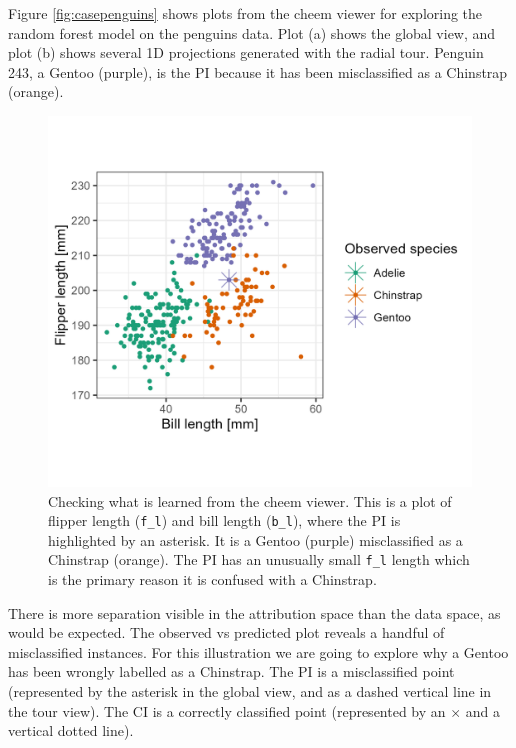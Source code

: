 \documentclass[
]{article}
\begin{document}
Figure \ref{fig:casepenguins} shows plots from the cheem viewer for exploring the random forest model on the penguins data. Plot (a) shows the global view, and plot (b) shows several 1D projections generated with the radial tour. Penguin 243, a Gentoo (purple), is the PI because it has been misclassified as a Chinstrap (orange).



\begin{figure}

{\centering \includegraphics[width=0.6\linewidth]{./figures/case_penguins_BlFl} 

}

\caption{Checking what is learned from the cheem viewer. This is a plot of flipper length (\texttt{f\_l}) and bill length (\texttt{b\_l}), where the PI is highlighted by an asterisk. It is a Gentoo (purple) misclassified as a Chinstrap (orange). The PI has an unusually small \texttt{f\_l} length which is the primary reason it is confused with a Chinstrap.}\label{fig:casepenguinsblfl}
\end{figure}

There is more separation visible in the attribution space than the data space, as would be expected. The observed vs predicted plot reveals a handful of misclassified instances. For this illustration we are going to explore why a Gentoo has been wrongly labelled as a Chinstrap. The PI is a misclassified point (represented by the asterisk in the global view, and as a dashed vertical line in the tour view). The CI is a correctly classified point (represented by an \(\times\) and a vertical dotted line).
\end{document}
